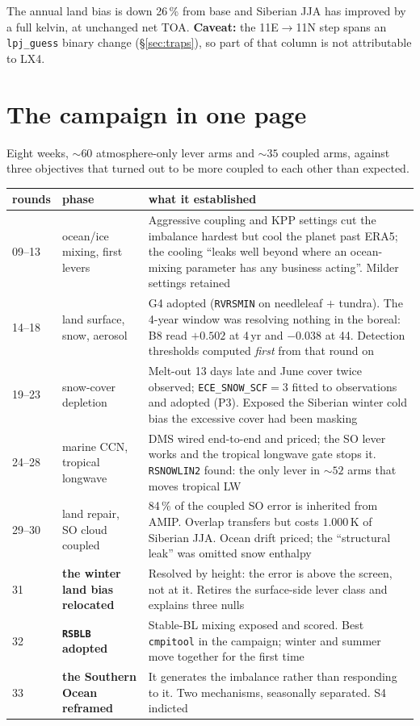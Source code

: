 \documentclass[10pt]{article}
\begin{document}
The annual land bias is down 26\,\% from base and Siberian JJA has improved by a full
kelvin, at unchanged net TOA. \textbf{Caveat:} the 11E$\to$11N step spans an
\texttt{lpj\_guess} binary change (\S\ref{sec:traps}), so part of that column is not
attributable to LX4.

\section{The campaign in one page}\label{sec:arc}
Eight weeks, ${\sim}60$ atmosphere-only lever arms and ${\sim}35$ coupled arms, against
three objectives that turned out to be more coupled to each other than expected.

\begin{center}\footnotesize
\begin{tabular}{p{} p{} p{}}
\toprule
rounds & phase & what it established \\
\midrule
09--13 & ocean/ice mixing, first levers &
Aggressive coupling and KPP settings cut the imbalance hardest but cool the planet past
ERA5; the cooling ``leaks well beyond where an ocean-mixing parameter has any business
acting''. Milder settings retained \\
14--18 & land surface, snow, aerosol &
G4 adopted (\texttt{RVRSMIN} on needleleaf $+$ tundra). The 4-year window was resolving
nothing in the boreal: B8 read $+0.502$ at 4\,yr and $-0.038$ at 44. Detection thresholds
computed \emph{first} from that round on \\
19--23 & snow-cover depletion &
Melt-out 13 days late and June cover twice observed; \texttt{ECE\_SNOW\_SCF}$=3$ fitted to
observations and adopted (P3). Exposed the Siberian winter cold bias the excessive cover
had been masking \\
24--28 & marine CCN, tropical longwave &
DMS wired end-to-end and priced; the SO lever works and the tropical longwave gate stops
it. \texttt{RSNOWLIN2} found: the only lever in ${\sim}52$ arms that moves tropical LW \\
29--30 & land repair, SO cloud coupled &
84\,\% of the coupled SO error is inherited from AMIP. Overlap transfers but costs
$1.000$\,K of Siberian JJA. Ocean drift priced; the ``structural leak'' was omitted snow
enthalpy \\
31 & \textbf{the winter land bias relocated} &
Resolved by height: the error is above the screen, not at it. Retires the surface-side
lever class and explains three nulls \\
32 & \textbf{\texttt{RSBLB} adopted} &
Stable-BL mixing exposed and scored. Best \texttt{cmpitool} in the campaign; winter and
summer move together for the first time \\
33 & \textbf{the Southern Ocean reframed} &
It generates the imbalance rather than responding to it. Two mechanisms, seasonally
separated. S4 indicted \\
\bottomrule
\end{tabular}
\end{center}
\end{document}
